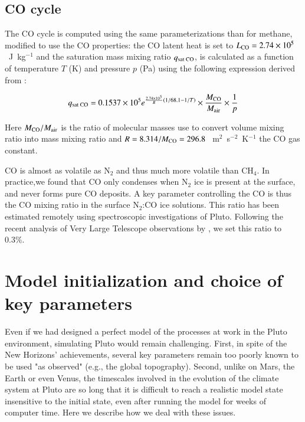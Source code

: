\subsection{CO cycle}

The CO cycle is computed using the same parameterizations than for methane, modified to use the CO
properties: the CO latent
heat is set to $L_{\mbox{\scriptsize CO}} = 2.74\times10^5$~J~kg$^{-1}$ and the      
saturation mass mixing ratio $q_{\mbox{\scriptsize  sat CO}}$, 
is calculated as a function of temperature $T$ (K) and pressure $p$ (Pa)
using the following expression derived from \cite{Fray:09}:

\begin{equation}
q_{\mbox{\scriptsize sat CO}} = 0.1537 \times 10^{5}  
e^{{\frac{2.74 \times 10^{5}}{R}} 
\left(  {1}/{68.1} -{1}/{T} \right) } 
\times \frac{M_{\mbox{\scriptsize CO}}}{M_{\mbox{\scriptsize air}}} \times \frac{1}{p}
\label{eq:cosat}
\end{equation}

Here ${M_{\mbox{\scriptsize CO}}}/{M_{\mbox{\scriptsize air}}}$ is the ratio of molecular masses use
to convert volume mixing ratio into mass mixing ratio and  
$R = 8.314/M_{\mbox{\scriptsize CO}} = 296.8~$~m$^2$~s$^{-2}$~K$^{-1}$ the CO gas constant.

CO is almost as volatile as N$_2$ and thus much more volatile than CH$_4$.  
In practice,we found that CO only condenses when N$_2$ ice is present at the surface, and never forms
pure CO deposits.
A key parameter controlling the CO is thus the CO mixing ratio in the surface N$_2$:CO ice solutions.
This ratio has been estimated remotely using spectroscopic investigations of Pluto. Following 
the recent analysis of Very Large Telescope observations by \cite{Merl:15}, we set this ratio to
0.3\%. 


\section{Model initialization and choice of key parameters}
\label{sc:initial}

Even if we had designed a perfect model of the processes at work in the Pluto environment,
simulating Pluto would remain challenging. First, in spite of the New
Horizons' achievements, several key parameters remain too poorly known to be used "as
observed" (e.g., the global topography). Second, unlike on Mars, the Earth or even
Venus, the timescales involved in the evolution of the climate system at Pluto are so 
long that it is difficult to reach a realistic model state insensitive to the initial state,
even after running the model for weeks of computer time. 
Here we describe how we deal with these issues. 

